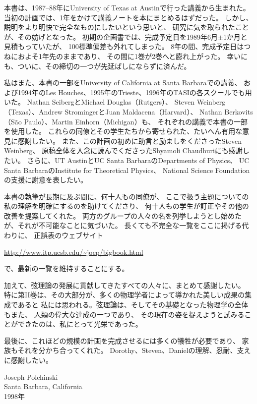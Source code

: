 本書は、1987--88年にUniversity of Texas at Austinで行った講義から生まれた。
当初の計画では、1年をかけて講義ノートを本にまとめるはずだった。
しかし、説明をより明快で完全なものにしたいという思いと、
研究に気を取られたことが、その妨げとなった。
初期の企画書では、完成予定日を1989年6月$\pm$1か月と見積もっていたが、
100標準偏差も外れてしまった。
8年の間、完成予定日はつねにおよそ1年先のままであり、
その間に1巻が2巻へと膨れ上がった。
幸いにも、ついに、その締切の一つが先延ばしにならずに済んだ。

私はまた、本書の一部をUniversity of California at Santa Barbaraでの講義、
および1994年のLes Houches、1995年のTrieste、1996年のTASIの各スクールでも用いた。
Nathan SeibergとMichael Douglas（Rutgers）、
Steven Weinberg（Texas）、Andrew StromingerとJuan Maldacena（Harvard）、
Nathan Berkovits（São Paulo）、Martin Einhorn（Michigan）も、
それぞれの講義で本書の一部を使用した。
これらの同僚とその学生たちから寄せられた、たいへん有用な意見に感謝したい。
また、この計画の初めに助言と励ましをくださったSteven Weinberg、
原稿全体を入念に読んでくださったShyamoli Chaudhuriにも感謝したい。
さらに、UT AustinとUC Santa BarbaraのDepartments of Physics、
UC Santa BarbaraのInstitute for Theoretical Physics、
National Science Foundationの支援に謝意を表したい。

本書の執筆が長期に及ぶ間に、何十人もの同僚が、
ここで扱う主題についての私の理解を明確にするのを助けてくださり、
何十人もの学生が訂正やその他の改善を提案してくれた。
両方のグループの人々の名を列挙しようとし始めたが、それが不可能なことに気づいた。
長くても不完全な一覧をここに掲げる代わりに、
正誤表のウェブサイト
\begin{center}
\url{http://www.itp.ucsb.edu/~joep/bigbook.html}
\end{center}
で、最新の一覧を維持することにする。

加えて、弦理論の発展に貢献してきたすべての人々に、まとめて感謝したい。
特に第II巻は、その大部分が、多くの物理学者によって導かれた美しい成果の集成であると
私には思われる。弦理論は、そしてその基礎となった物理学の全体もまた、
人類の偉大な達成の一つであり、
その現在の姿を捉えようと試みることができたのは、私にとって光栄であった。

最後に、これほどの規模の計画を完成させるには多くの犠牲が必要であり、
家族もそれを分かち合ってくれた。
Dorothy、Steven、Danielの理解、忍耐、支えに感謝したい。

\begin{flushright}
Joseph Polchinski\\
Santa Barbara, California\\
1998年
\end{flushright}

